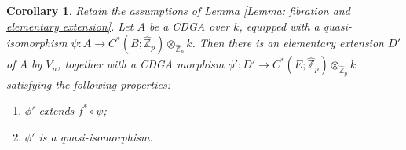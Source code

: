 \documentclass[11pt]{amsart}
\newtheorem{corollary}[theorem]{Corollary}
\theoremstyle{definition}
\numberwithin{equation}{section}
\numberwithin{equation}{section}
\newcommand\ZZ{\mathbb{Z}}
\begin{document}
\begin{corollary}\label{Cor: Extension of Minimal Model for Fibrations}
Retain the assumptions of Lemma \ref{Lemma: fibration and elementary extension}. Let $A$ be a CDGA over $k$, equipped with a quasi-isomorphism $\psi:A\rightarrow C^*(B;\widehat{\ZZ}_p)\otimes_{\widehat{\ZZ}_p} k$. Then there is an elementary extension $D'$ of $A$ by $V_n$, together with a CDGA morphism $\phi':D'\rightarrow C^*(E;\widehat{\ZZ}_p)\otimes_{\widehat{\ZZ}_p} k$ satisfying the following properties:
\begin{enumerate}[leftmargin=0.25in]
    \item $\phi'$ extends $f^*\circ \psi$;
    \item $\phi'$ is a quasi-isomorphism.
\end{enumerate}
\end{corollary}
\end{document}
